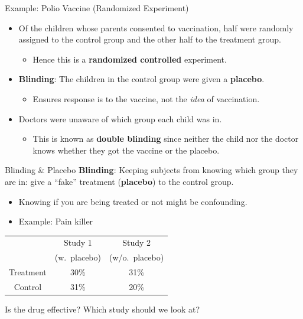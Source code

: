 \documentclass[
  ignorenonframetext, 10pt
]{beamer}
\providecommand{\tightlist}{%
  \setlength{\itemsep}{0pt}\setlength{\parskip}{0pt}}
\newcommand{\red}[1]{\textit{\textcolor{rubineRed}{#1}}}
\begin{document}
\begin{frame}{Example: Polio Vaccine (Randomized Experiment)}
\protect\hypertarget{example-polio-vaccine-randomized-experiment}{}
\begin{itemize}
\tightlist
\item
  Of the children whose parents consented to vaccination, half were
  randomly assigned to the control group and the other half to the
  treatment group.

  \begin{itemize}
  \tightlist
  \item
    Hence this is a \textbf{randomized controlled} experiment.
  \end{itemize}
\item
  \textbf{Blinding}: The children in the control group were given a
  \textbf{placebo}.

  \begin{itemize}
  \tightlist
  \item
    Ensures response is to the vaccine, not the \red{idea} of
    vaccination.
  \end{itemize}
\item
  Doctors were unaware of which group each child was in.

  \begin{itemize}
  \tightlist
  \item
    This is known as \textbf{double blinding} since neither the child
    nor the doctor knows whether they got the vaccine or the placebo.
  \end{itemize}
\end{itemize}
\end{frame}

\begin{frame}{Blinding \& Placebo}
\protect\hypertarget{blinding-placebo}{}
\textbf{Blinding}: Keeping subjects from knowing which group they are
in: give a ``fake'' treatment (\textbf{placebo}) to the control group.

\begin{itemize}
\tightlist
\item
  Knowing if you are being treated or not might be confounding.
\item
  Example: Pain killer
\end{itemize}

\begin{center}
\begin{tabular}{c|cc}
&Study 1 & Study 2  \\[-3pt]
&(w.~placebo) & (w/o.~placebo)\\
\hline
Treatment & 30\%  & 31\% \\
Control   & 31\%  & 20\% \\
\end{tabular}
\end{center}

Is the drug effective? Which study should we look at?
\end{frame}
\end{document}
